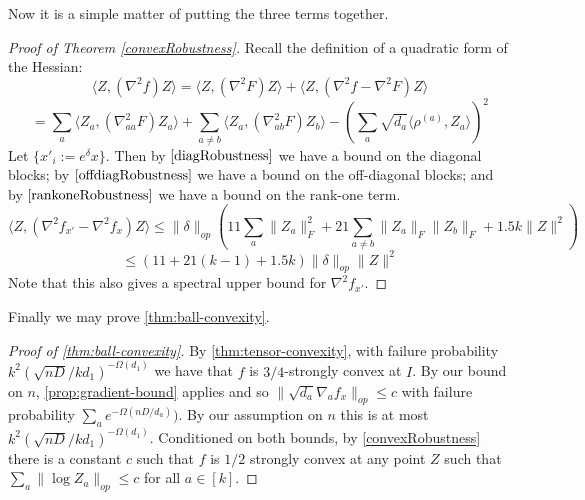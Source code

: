 \documentclass{article}
\newcommand\samp{x}
\newcommand{\CF}[1]{{\color{purple}[CF: #1]}}
\newcommand{\AR}[1]{{\color{orange}[AR: #1]}}
\begin{document}
Now it is a simple matter of putting the three terms together. 

\begin{proof} [Proof of Theorem \ref{convexRobustness}]
Recall the definition of a quadratic form of the Hessian:
\[ \langle Z, (\nabla^{2} f) Z \rangle = \langle Z, (\nabla^{2} F) Z \rangle + \langle Z, (\nabla^{2} f - \nabla^{2} F) Z \rangle     \]
\[ = \sum_{a} \langle Z_{a}, (\nabla^{2}_{aa} F) Z_{a} \rangle + \sum_{a \neq b} \langle Z_{a}, (\nabla^{2}_{ab} F) Z_{b} \rangle - \left( \sum_{a} \sqrt{d_{a}} \langle \rho^{(a)}, Z_{a} \rangle  \right)^{2}       \]
Let $\{\samp'_{i} := e^{\delta} \samp\}$. Then by $\ref{diagRobustness}$ we have a bound on the diagonal blocks; by $\ref{offdiagRobustness}$ we have a bound on the off-diagonal blocks; and by $\ref{rankoneRobustness}$ we have a bound on the rank-one term. 
\[ \langle Z, (\nabla^2 f_{\samp'} - \nabla^{2} f_{\samp}) Z \rangle \leq \|\delta\|_{op} \left( 11 \sum_{a} \|Z_{a}\|_{F}^{2} + 21 \sum_{a \neq b} \|Z_{a}\|_{F} \|Z_{b}\|_{F} + 1.5 k \|Z\|^{2} \right)   \]
\[ \leq (11 + 21(k-1) + 1.5 k) \|\delta\|_{op} \|Z\|^{2}    \]
Note that this also gives a spectral upper bound for $\nabla^{2} f_{\samp'}$. 
\end{proof}

Finally we may prove \cref{thm:ball-convexity}.
\begin{proof}[Proof of \cref{thm:ball-convexity}]
By \cref{thm:tensor-convexity}, with failure probability $k^2 ({\sqrt{nD}}/{kd_1})^{ - \Omega(d_1)}$ we have that $f$ is $3/4$-strongly convex at $I$. By our bound on $n$,  \cref{prop:gradient-bound} applies and so $\|\sqrt{d_{a}} \nabla_{a} f_{\samp}\|_{op} \leq c$ with failure probability $\sum_a e^{ - \Omega(nD/d_a)})$. By our assumption on $n$ this is at most $k^2 ({\sqrt{nD}}/{kd_1})^{ - \Omega(d_1)}$. Conditioned on both bounds, by \cref{convexRobustness} there is a constant $c$ such that $f$ is $1/2$ strongly convex at any point $Z$ such that $\sum_a \|\log Z_a\|_{op} \leq  c$ for all $a \in [k]$. \end{proof}







\end{document}
